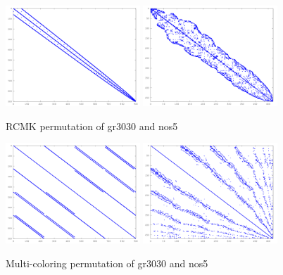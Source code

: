 \begin{figure}[!ht]
\centering
\includegraphics[width=0.45\textwidth]{./fig/perm/gr_30_30_rcmk.pdf}
\includegraphics[width=0.45\textwidth]{./fig/perm/nos5_rcmk.pdf}
\caption{RCMK permutation of gr3030 and nos5}
\end{figure}

\begin{figure}[!ht]
\centering
\includegraphics[width=0.45\textwidth]{./fig/perm/gr_30_30_mc.pdf}
\includegraphics[width=0.45\textwidth]{./fig/perm/nos5_mc.pdf}
\caption{Multi-coloring permutation of gr3030 and nos5}
\end{figure}

